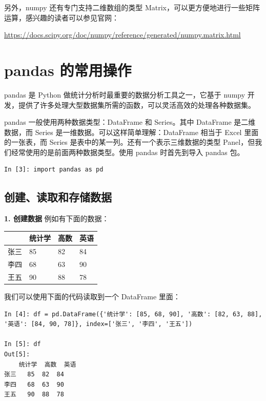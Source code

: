另外，numpy 还有专门支持二维数组的类型 Matrix，可以更方便地进行一些矩阵运算，感兴趣的读者可以参见官网：

\href{https://docs.scipy.org/doc/numpy/reference/generated/numpy.matrix.html}{https://docs.scipy.org/doc/numpy/reference/generated/numpy.matrix.html}



\clearpage
\section{pandas 的常用操作}

pandas 是 Python 做统计分析时最重要的数据分析工具之一，它基于 numpy 开发，提供了许多处理大型数据集所需的函数，可以灵活高效的处理各种数据集。

pandas 一般使用两种数据类型：DataFrame 和 Series。其中 DataFrame 是二维数据，而 Series 是一维数据。可以这样简单理解：DataFrame 相当于 Excel 里面的一张表，而 Series 是表中的某一列。还有一个表示三维数据的类型 Panel，但我们经常使用的是前面两种数据类型。使用 pandas 时首先到导入 pandas 包。

\begin{lstlisting}[Language=Python]
In [3]: import pandas as pd
\end{lstlisting}

\subsection{创建、读取和存储数据}

\noindent\textbf{1. 创建数据}
 例如有下面的数据：

 \begin{table}[!ht]
 \centering
 \renewcommand{\arraystretch}{1.2}
 \begin{tabular}{|l|l|l|l|}
 \hline
 &统计学 & 高数 & 英语 \\ \hline
 张三 & 85 & 82 & 84 \\ \hline
 李四 & 68 & 63 & 90 \\ \hline
 王五 & 90 & 88 & 78 \\ \hline
 \end{tabular}
 \end{table}

我们可以使用下面的代码读取到一个 DataFrame 里面：

\begin{lstlisting}[Language=Python]
In [4]: df = pd.DataFrame({'统计学': [85, 68, 90], '高数': [82, 63, 88], '英语': [84, 90, 78]}, index=['张三', '李四', '王五'])

In [5]: df
Out[5]:
    统计学  高数  英语
张三   85  82  84
李四   68  63  90
王五   90  88  78
\end{lstlisting}

